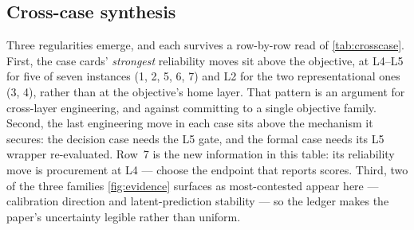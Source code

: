 \subsection{Cross-case synthesis}
\label{sec:crosscase}
Three regularities emerge, and each survives a row-by-row read of \cref{tab:crosscase}. First,
the case cards' \emph{strongest} reliability moves sit above the objective, at L4--L5 for five
of seven instances (1, 2, 5, 6, 7) and L2 for the two representational ones (3, 4), rather than at
the objective's home layer. That pattern is an argument for cross-layer engineering, and against
committing to a single objective family. Second, the
last engineering move in each case sits above the mechanism it secures: the decision case needs
the L5 gate, and the formal case needs its L5 wrapper re-evaluated. Row~7 is the new information
in this table: its reliability move is procurement at L4 --- choose the endpoint that reports
scores. Third, two of the three families \cref{fig:evidence} surfaces as
most-contested appear here --- calibration direction and latent-prediction stability --- so the
ledger makes the paper's uncertainty legible rather than uniform.

